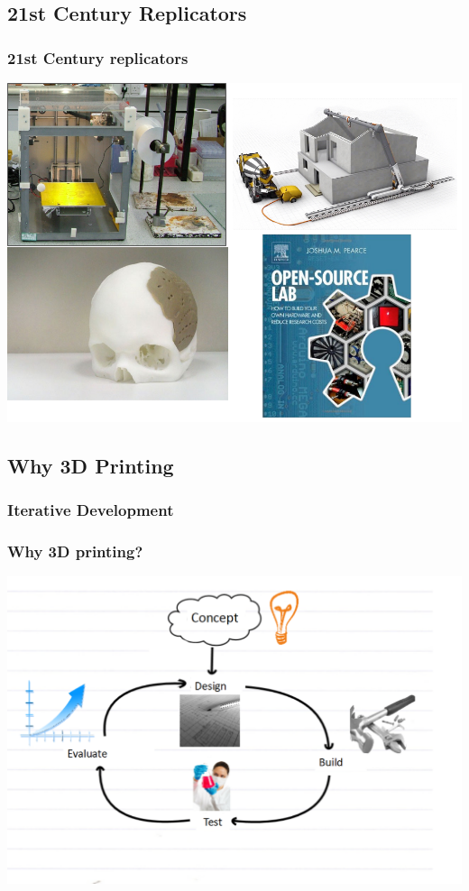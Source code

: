 \documentclass[10pt, compress]{beamer}
\begin{document}
\subsection{21st Century Replicators}
\begin{frame}[fragile]
\frametitle{21st Century replicators}
\begin{center}\includegraphics[width=.9\textwidth]{fig1.png}\end{center}
\end{frame}






\subsection{Why 3D Printing}
\subsubsection{Iterative Development}
\begin{frame}[fragile]
\frametitle{Why 3D printing?}
\begin{center}\includegraphics[width=.9\textwidth]{iterative_cycle.PNG}\end{center}


\end{frame}
\end{document}
